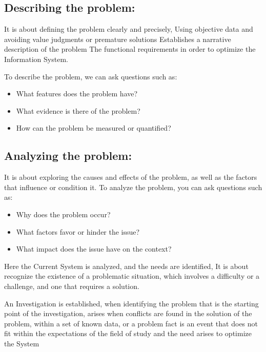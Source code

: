 \documentclass{article}
\begin{document}
\subsection{Describing the problem:}
\par It is about defining the problem clearly and precisely, Using objective
data and avoiding value judgments or premature solutions Establishes a narrative
description of the problem The functional requirements in order to optimize the
Information System.

\par To describe the problem, we can ask questions such as:

\begin{itemize}
	\item What features does the problem have?
	\item What evidence is there of the problem?
	\item How can the problem be measured or quantified?
\end{itemize}

\subsection{Analyzing the problem:}
\par It is about exploring the causes and effects of the problem, as well as
the factors that influence or condition it. To analyze the problem, you can ask
questions such as:

\begin{itemize}
	\item Why does the problem occur?
	\item What factors favor or hinder the issue?
	\item What impact does the issue have on the context?
\end{itemize}

\par Here the Current System is analyzed, and the needs are identified, It is
about recognize the existence of a problematic situation, which involves a
difficulty or a challenge, and one that requires a solution.

\par An Investigation is established, when identifying the problem that is the
starting point of the investigation, arises when conflicts are found in the
solution of the problem, within a set of known data, or a problem fact is an
event that does not fit within the expectations of the field of study and the
need arises to optimize the System
\end{document}
